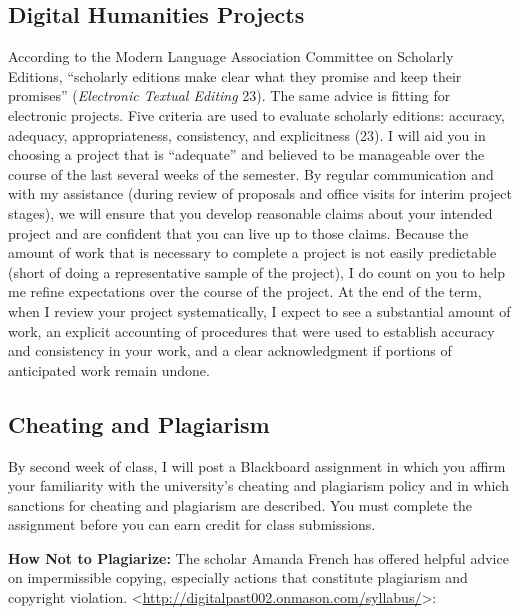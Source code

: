 \documentclass[]{article}
\begin{document}
\subsection{Digital Humanities
Projects}\label{digital-humanities-projects}

According to the Modern Language Association Committee on Scholarly
Editions, ``scholarly editions make clear what they promise and keep
their promises'' (\emph{Electronic Textual Editing} 23). The same advice
is fitting for electronic projects. Five criteria are used to evaluate
scholarly editions: accuracy, adequacy, appropriateness, consistency,
and explicitness (23). I will aid you in choosing a project that is
``adequate'' and believed to be manageable over the course of the last
several weeks of the semester. By regular communication and with my
assistance (during review of proposals and office visits for interim
project stages), we will ensure that you develop reasonable claims about
your intended project and are confident that you can live up to those
claims. Because the amount of work that is necessary to complete a
project is not easily predictable (short of doing a representative
sample of the project), I do count on you to help me refine expectations
over the course of the project. At the end of the term, when I review
your project systematically, I expect to see a substantial amount of
work, an explicit accounting of procedures that were used to establish
accuracy and consistency in your work, and a clear acknowledgment if
portions of anticipated work remain undone.

\subsection{Cheating and Plagiarism}\label{cheating-and-plagiarism}

By second week of class, I will post a Blackboard assignment in which
you affirm your familiarity with the university's cheating and
plagiarism policy and in which sanctions for cheating and plagiarism are
described. You must complete the assignment before you can earn credit
for class submissions.

\textbf{How Not to Plagiarize: } The scholar Amanda French has offered
helpful advice on impermissible copying, especially actions that
constitute plagiarism and copyright violation.
\textless{}\url{http://digitalpast002.onmason.com/syllabus/}\textgreater{}:
\end{document}
